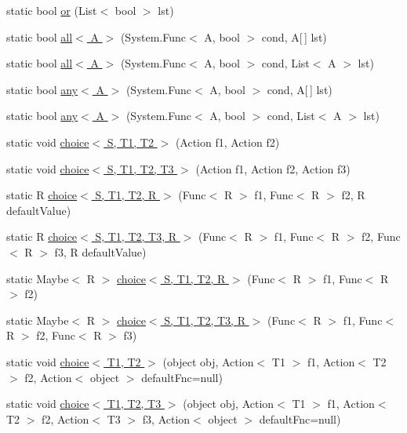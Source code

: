 \begin{DoxyCompactItemize}
\item 
static bool \hyperlink{class_prelude_a41c2e08156e8d5ff0443c3c0d8c4c11b}{or} (List$<$ bool $>$ lst)
\item 
static bool \hyperlink{class_prelude_a3263d67ecf099c1385aa6230be51b6b6}{all$<$ A $>$} (System.\+Func$<$ A, bool $>$ cond, A\mbox{[}$\,$\mbox{]} lst)
\item 
static bool \hyperlink{class_prelude_ad66e876349c3e6257fafd90ebb44f46e}{all$<$ A $>$} (System.\+Func$<$ A, bool $>$ cond, List$<$ A $>$ lst)
\item 
static bool \hyperlink{class_prelude_acd333df1552c2ff8a5a25b2b424da0e7}{any$<$ A $>$} (System.\+Func$<$ A, bool $>$ cond, A\mbox{[}$\,$\mbox{]} lst)
\item 
static bool \hyperlink{class_prelude_aee59a10fc6f74589f6c4a00c763ad46c}{any$<$ A $>$} (System.\+Func$<$ A, bool $>$ cond, List$<$ A $>$ lst)
\item 
static void \hyperlink{class_prelude_a7b0abb79dd5696bb9801a889147c1b65}{choice$<$ S, T1, T2 $>$} (Action f1, Action f2)
\item 
static void \hyperlink{class_prelude_a7d600674be3d3d0eb98952b46bfc4b07}{choice$<$ S, T1, T2, T3 $>$} (Action f1, Action f2, Action f3)
\item 
static R \hyperlink{class_prelude_a8fb1ece1b192ad71402ecea74075c24b}{choice$<$ S, T1, T2, R $>$} (Func$<$ R $>$ f1, Func$<$ R $>$ f2, R default\+Value)
\item 
static R \hyperlink{class_prelude_a238f99bf8b8b8e3822387f9cdf83cfc0}{choice$<$ S, T1, T2, T3, R $>$} (Func$<$ R $>$ f1, Func$<$ R $>$ f2, Func$<$ R $>$ f3, R default\+Value)
\item 
static Maybe$<$ R $>$ \hyperlink{class_prelude_a2619a9b25bc51a4a4d419dbd786c0f60}{choice$<$ S, T1, T2, R $>$} (Func$<$ R $>$ f1, Func$<$ R $>$ f2)
\item 
static Maybe$<$ R $>$ \hyperlink{class_prelude_a744608cc72f4ff86874f2a0421b76aca}{choice$<$ S, T1, T2, T3, R $>$} (Func$<$ R $>$ f1, Func$<$ R $>$ f2, Func$<$ R $>$ f3)
\item 
static void \hyperlink{class_prelude_a1bb7009f1b3a1bb4cc19c1230c33c862}{choice$<$ T1, T2 $>$} (object obj, Action$<$ T1 $>$ f1, Action$<$ T2 $>$ f2, Action$<$ object $>$ default\+Fnc=null)
\item 
static void \hyperlink{class_prelude_a87cf1bc92943eb8ff3f822546f6bcb0f}{choice$<$ T1, T2, T3 $>$} (object obj, Action$<$ T1 $>$ f1, Action$<$ T2 $>$ f2, Action$<$ T3 $>$ f3, Action$<$ object $>$ default\+Fnc=null)
\item 

\end{DoxyCompactItemize}

